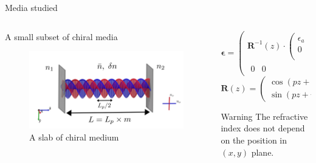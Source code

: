 \documentclass[aspectratio=169]{beamer}
\begin{document}
\begin{frame}{Media studied}
	\begin{columns}
		\begin{column}{0.5\textwidth}
			{\huge A small subset of chiral media}
			\begin{figure}
				\centering
				\includegraphics[width=\linewidth]{images/simple_cavity}
				\caption{A slab of chiral medium}
			\end{figure}
		\end{column}
		\pause
		\begin{column}{0.5\textwidth}
			\begin{equation*}
				\bm{\epsilon} = \begin{pmatrix}\bm{R}^{-1}(z)\cdot\begin{pmatrix}
				\epsilon_a & 0\\
				0 & \epsilon_b\\
				\end{pmatrix}\cdot\bm{R}(z) & \begin{matrix}
				0\\0
				\end{matrix}\\
				\begin{matrix}
				0 & 0
				\end{matrix} & \epsilon_c
				\end{pmatrix}
			\end{equation*}
			\begin{equation*}
				\bm{R}(z) = \begin{pmatrix}
				\cos(pz+\psi) & -\sin(pz+\psi)\\
				\sin(pz+\psi) & \cos(pz+\psi)
				\end{pmatrix}
			\end{equation*}
			\pause
			\begin{alertblock}{Warning}
				The refractive index does not depend on the position in $(x,y)$ plane.
			\end{alertblock}
		\end{column}
	\end{columns}	
\end{frame}
\end{document}

